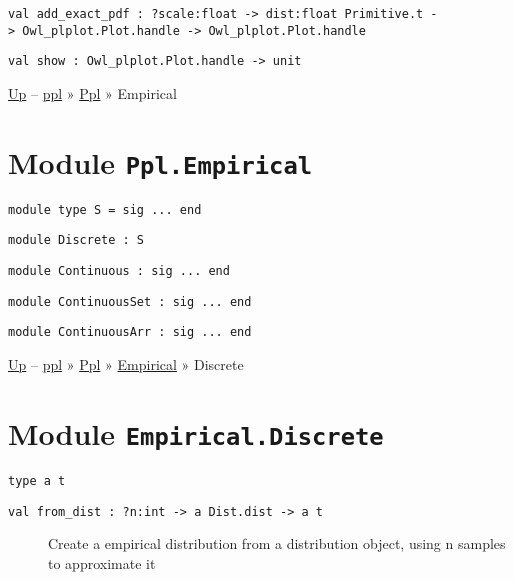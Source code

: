 \protect\hyperlink{val-addux5fexactux5fpdf}{}\texttt{val\ add\_exact\_pdf\ :\ ?⁠scale:float\ -\textgreater{}\ dist:float\ Primitive.t\ -\textgreater{}\ Owl\_plplot.Plot.handle\ -\textgreater{}\ Owl\_plplot.Plot.handle}

\protect\hyperlink{val-show}{}\texttt{val\ show\ :\ Owl\_plplot.Plot.handle\ -\textgreater{}\ unit}

\href{../index.html}{Up} -- \href{../../index.html}{ppl} »
\href{../index.html}{Ppl} » Empirical

\section{\texorpdfstring{Module
\texttt{Ppl.Empirical}}{Module Ppl.Empirical}}\label{module-ppl.empirical}

\hypertarget{module-type-S}{}
\protect\hyperlink{module-type-S}{}\texttt{module\ type\ S\ =\ sig\ ...\ end}

\hypertarget{module-Discrete}{}
\protect\hyperlink{module-Discrete}{}\texttt{module\ Discrete\ :\ S}

\hypertarget{module-Continuous}{}
\protect\hyperlink{module-Continuous}{}\texttt{module\ Continuous\ :\ sig\ ...\ end}

\hypertarget{module-ContinuousSet}{}
\protect\hyperlink{module-ContinuousSet}{}\texttt{module\ ContinuousSet\ :\ sig\ ...\ end}

\hypertarget{module-ContinuousArr}{}
\protect\hyperlink{module-ContinuousArr}{}\texttt{module\ ContinuousArr\ :\ sig\ ...\ end}

\href{../index.html}{Up} -- \href{../../../index.html}{ppl} »
\href{../../index.html}{Ppl} » \href{../index.html}{Empirical} »
Discrete

\section{\texorpdfstring{Module
\texttt{Empirical.Discrete}}{Module Empirical.Discrete}}\label{module-empirical.discrete}

\protect\hyperlink{type-t}{}\texttt{type\ \textquotesingle{}a\ t}

\begin{description}
\item[{\protect\hyperlink{val-fromux5fdist}{}\texttt{val\ from\_dist\ :\ ?⁠n:int\ -\textgreater{}\ \textquotesingle{}a\ Dist.dist\ -\textgreater{}\ \textquotesingle{}a\ t}}]
Create a empirical distribution from a distribution object, using n
samples to approximate it
\end{description}

